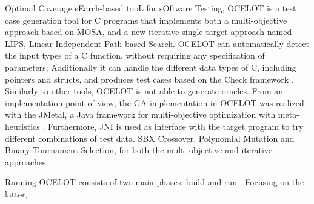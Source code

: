 Optimal Coverage sEarch-based tooL for sOftware Testing, OCELOT \cite{DBLP:conf/ssbse/ScalabrinoGNOL16} is a test case generation tool for C programs that implements both a multi-objective approach based on MOSA, and a new iterative single-target approach named LIPS, Linear Independent Path-based Search.
OCELOT can automatically detect the input types of a C function, without requiring any specification of parameters; Additionally it can handle the different data types of C, including pointers and structs, and produces test cases based on the Check framework \cite{Check}.
Similarly to other tools, OCELOT is not able to generate oracles.
From an implementation point of view, the GA implementation in OCELOT was realized with the JMetal, a Java framework for multi-objective optimization with meta-heuristics \cite{JMetal}. Furthermore, JNI is used as interface with the target program to try different combinations of test data.
SBX Crossover, Polynomial Mutation and Binary Tournament Selection, for both the multi-objective and iterative approaches.


Running OCELOT consists of two main phases: build and run \cite{DBLP:conf/kbse/ScalabrinoGNGLG18}. Focusing on the latter, 
